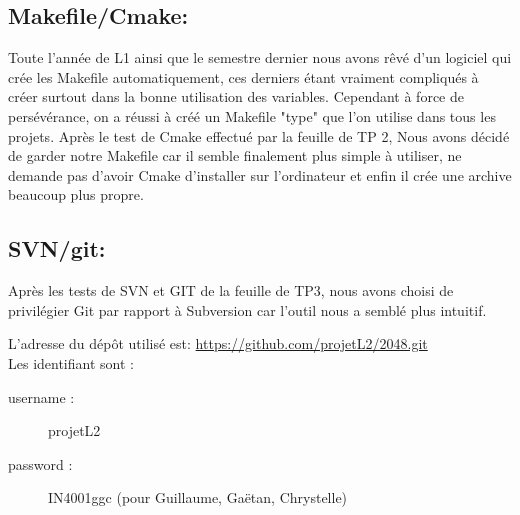 \documentclass{report}
\begin{document}
\subsection*{Makefile/Cmake:}
\begin{description}
Toute l'année de L1 ainsi que le semestre dernier nous avons rêvé d'un logiciel qui crée les Makefile automatiquement, ces derniers étant vraiment compliqués à créer surtout dans la bonne utilisation des variables. Cependant à force de persévérance, on a réussi à créé un Makefile "type" que l'on utilise dans tous les projets. Après le test de Cmake effectué par la feuille de TP 2, Nous avons décidé de garder notre Makefile car il semble finalement plus simple à utiliser, ne demande pas d'avoir Cmake d'installer sur l'ordinateur et enfin il crée une archive beaucoup plus propre.
\end{description}

\subsection*{SVN/git:}
\begin{description}
Après les tests de SVN et GIT de la feuille de TP3, nous avons choisi de privilégier Git par rapport à Subversion car l'outil nous a semblé plus intuitif.
\end{description}
L'adresse du dépôt utilisé est: \url{https://github.com/projetL2/2048.git} \\Les identifiant sont :
\begin{description}
\item [username : ] projetL2
\item [password : ] IN4001ggc  (pour Guillaume, Gaëtan, Chrystelle)
\end{description}
\end{document}
